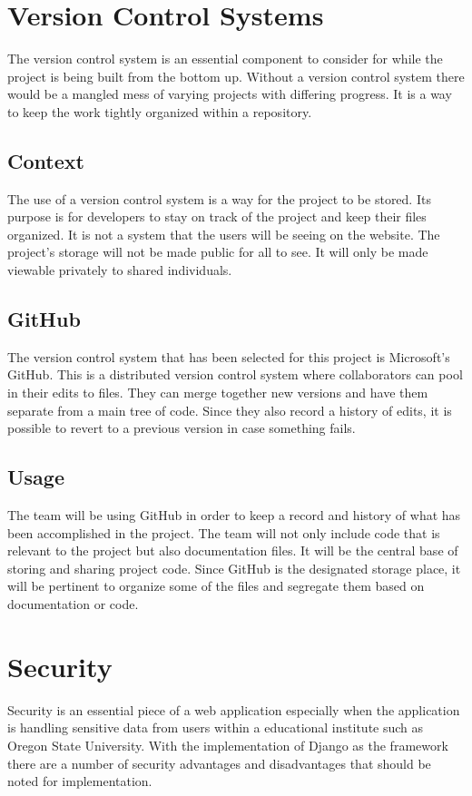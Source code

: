 \documentclass[onecolumn, draftclsnofoot,10pt, compsoc]{IEEEtran}
\begin{document}
\section{Version Control Systems}
The version control system is an essential component to consider for while the project is being built from the bottom up. Without a version control system there would be a mangled mess of varying projects with differing progress. It is a way to keep the work tightly organized within a repository.

\subsection{Context}
The use of a version control system is a way for the project to be stored. Its purpose is for developers to stay on track of the project and keep their files organized. It is not a system that the users will be seeing on the website. The project's storage will not be made public for all to see. It will only be made viewable privately to shared individuals.

\subsection{GitHub}
The version control system that has been selected for this project is Microsoft’s GitHub. This is a distributed version control system where collaborators can pool in their edits to files. They can merge together new versions and have them separate from a main tree of code. Since they also record a history of edits, it is possible to revert to a previous version in case something fails.

\subsection{Usage}
The team will be using GitHub in order to keep a record and history of what has been accomplished in the project. The team will not only include code that is relevant to the project but also documentation files. It will be the central base of storing and sharing project code. Since GitHub is the designated storage place, it will be pertinent to organize some of the files and segregate them based on documentation or code.


\section{Security}
Security is an essential piece of a web application especially when the application is handling sensitive data from users within a educational institute such as Oregon State University. With the implementation of Django as the framework there are a number of security advantages and disadvantages that should be noted for implementation. 
\end{document}
